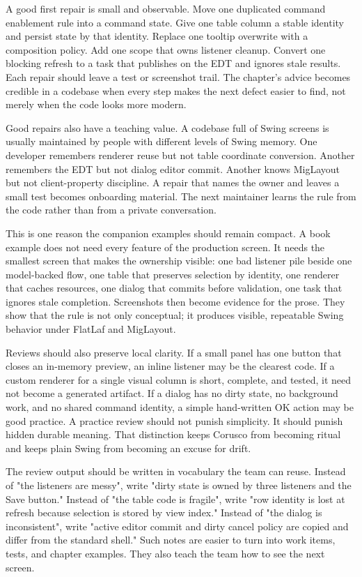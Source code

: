A good first repair is small and observable. Move one duplicated command
enablement rule into a command state. Give one table column a stable identity
and persist state by that identity. Replace one tooltip overwrite with a
composition policy. Add one scope that owns listener cleanup. Convert one
blocking refresh to a task that publishes on the EDT and ignores stale results.
Each repair should leave a test or screenshot trail. The chapter's advice
becomes credible in a codebase when every step makes the next defect easier to
find, not merely when the code looks more modern.

Good repairs also have a teaching value. A codebase full of Swing screens is
usually maintained by people with different levels of Swing memory. One
developer remembers renderer reuse but not table coordinate conversion. Another
remembers the EDT but not dialog editor commit. Another knows MigLayout but not
client-property discipline. A repair that names the owner and leaves a small
test becomes onboarding material. The next maintainer learns the rule from the
code rather than from a private conversation.

This is one reason the companion examples should remain compact. A book example
does not need every feature of the production screen. It needs the smallest
screen that makes the ownership visible: one bad listener pile beside one
model-backed flow, one table that preserves selection by identity, one renderer
that caches resources, one dialog that commits before validation, one task that
ignores stale completion. Screenshots then become evidence for the prose. They
show that the rule is not only conceptual; it produces visible, repeatable
Swing behavior under FlatLaf and MigLayout.

Reviews should also preserve local clarity. If a small panel has one button
that closes an in-memory preview, an inline listener may be the clearest code.
If a custom renderer for a single visual column is short, complete, and tested,
it need not become a generated artifact. If a dialog has no dirty state, no
background work, and no shared command identity, a simple hand-written OK
action may be good practice. A practice review should not punish simplicity.
It should punish hidden durable meaning. That distinction keeps Corusco from
becoming ritual and keeps plain Swing from becoming an excuse for drift.

The review output should be written in vocabulary the team can reuse. Instead
of "the listeners are messy", write "dirty state is owned by three listeners and
the Save button." Instead of "the table code is fragile", write "row identity is
lost at refresh because selection is stored by view index." Instead of "the
dialog is inconsistent", write "active editor commit and dirty cancel policy are
copied and differ from the standard shell." Such notes are easier to turn into
work items, tests, and chapter examples. They also teach the team how to see
the next screen.

